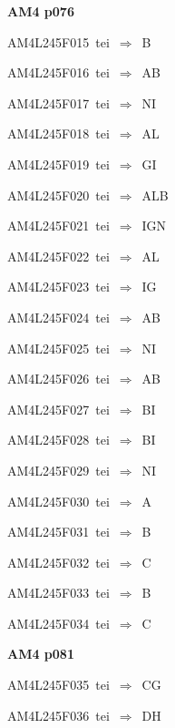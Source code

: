 \par\vfill\eject
{\bf\hfill AM4 p076\hfill\hbox{}}\par\bigskip
{\sixrm AM4L245F015\ {\sixit tei}\ }$\Rightarrow$\ {\tenit B}\par\smallskip
{\sixrm AM4L245F016\ {\sixit tei}\ }$\Rightarrow$\ AB\par\smallskip
{\sixrm AM4L245F017\ {\sixit tei}\ }$\Rightarrow$\ NI\par\smallskip
{\sixrm AM4L245F018\ {\sixit tei}\ }$\Rightarrow$\ AL\par\smallskip
{\sixrm AM4L245F019\ {\sixit tei}\ }$\Rightarrow$\ GI\par\smallskip
{\sixrm AM4L245F020\ {\sixit tei}\ }$\Rightarrow$\ ALB\par\smallskip
{\sixrm AM4L245F021\ {\sixit tei}\ }$\Rightarrow$\ IGN\par\smallskip
{\sixrm AM4L245F022\ {\sixit tei}\ }$\Rightarrow$\ AL\par\smallskip
{\sixrm AM4L245F023\ {\sixit tei}\ }$\Rightarrow$\ IG\par\smallskip
{\sixrm AM4L245F024\ {\sixit tei}\ }$\Rightarrow$\ AB\par\smallskip
{\sixrm AM4L245F025\ {\sixit tei}\ }$\Rightarrow$\ NI\par\smallskip
{\sixrm AM4L245F026\ {\sixit tei}\ }$\Rightarrow$\ AB\par\smallskip
{\sixrm AM4L245F027\ {\sixit tei}\ }$\Rightarrow$\ BI\par\smallskip
{\sixrm AM4L245F028\ {\sixit tei}\ }$\Rightarrow$\ BI\par\smallskip
{\sixrm AM4L245F029\ {\sixit tei}\ }$\Rightarrow$\ NI\par\smallskip
{\sixrm AM4L245F030\ {\sixit tei}\ }$\Rightarrow$\ A\par\smallskip
{\sixrm AM4L245F031\ {\sixit tei}\ }$\Rightarrow$\ B\par\smallskip
{\sixrm AM4L245F032\ {\sixit tei}\ }$\Rightarrow$\ C\par\smallskip
{\sixrm AM4L245F033\ {\sixit tei}\ }$\Rightarrow$\ B\par\smallskip
{\sixrm AM4L245F034\ {\sixit tei}\ }$\Rightarrow$\ C\par\smallskip

\par\vfill\eject
{\bf\hfill AM4 p081\hfill\hbox{}}\par\bigskip
{\sixrm AM4L245F035\ {\sixit tei}\ }$\Rightarrow$\ CG\par\smallskip
{\sixrm AM4L245F036\ {\sixit tei}\ }$\Rightarrow$\ DH\par\smallskip

